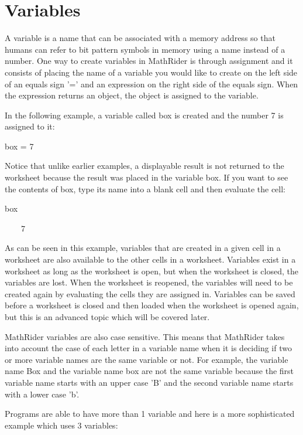 \documentclass[12pt,oneside]{book}
\begin{document}
\section[Variables]{Variables}

A variable is a name that can be associated with a memory address so that humans can refer to bit pattern symbols in memory using a name instead of a number. One way to create variables in MathRider is through assignment and it consists of placing the name of a variable you would like to create on the left side of an equals sign '=' and an expression on the right side of the equals sign. When the expression returns an object, the object is assigned to the variable.

In the following example, a variable called box is created and the number 7 is assigned to it: 

box = 7

{\textbar}


Notice that unlike earlier examples, a displayable result is not returned to the worksheet because the result was placed in the variable box. If you want to see the contents of box, type its name into a blank cell and then evaluate the cell: 

box

{\textbar}

\ \ \ \ 7


As can be seen in this example, variables that are created in a given cell in a worksheet are also available to the other cells in a worksheet. Variables exist in a worksheet as long as the worksheet is open, but when the worksheet is closed, the variables are lost. When the worksheet is reopened, the variables will need to be created again by evaluating the cells they are assigned in. Variables can be saved before a worksheet is closed and then loaded when the worksheet is opened again, but this is an advanced topic which will be covered later. 

MathRider variables are also case sensitive. This means that MathRider takes into account the case of each letter in a variable name when it is deciding if two or more variable names are the same variable or not. For example, the variable name Box and the variable name box are not the same variable because the first variable name starts with an upper case 'B' and the second variable name starts with a lower case 'b'. 

Programs are able to have more than 1 variable and here is a more sophisticated example which uses 3 variables: 
\end{document}
